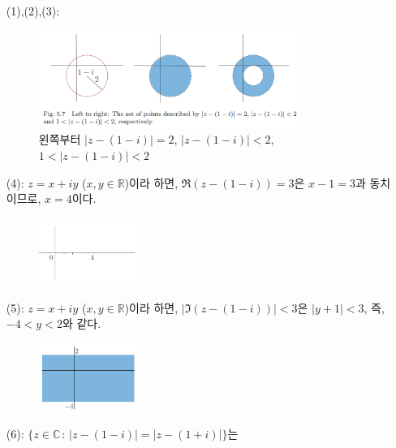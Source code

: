 \begin{itemize}
\item[(1),(2),(3):] \
\begin{figure}[h!]
\begin{center}
\includegraphics[width=0.8\textwidth]{./figs/fig-5-7}
\end{center}
\caption{왼쪽부터 $|z-(1-i)|=2$, $|z-(1-i)|<2$,
$1<|z-(1-i)|<2$}
\label{fig-5-7}
\end{figure}
\item[(4):] $z=x+iy$ ($x,y\in\mathbb R$)이라 하면,
$\Re(z-(1-i))=3$은 $x-1=3$과 동치이므로, $x=4$이다.
\begin{figure}[h!]
\begin{center}
\includegraphics[width=0.3\textwidth]{./figs/fig-s-0-2}
\end{center}
\end{figure}
\item[(5):] $z=x+iy$ ($x,y\in\mathbb R$)이라 하면,
$|\Im(z-(1-i))|<3$은 $|y+1|<3$, 즉, $-4<y<2$와 같다.
\begin{figure}[h!]
\begin{center}
\includegraphics[width=0.3\textwidth]{./figs/fig-s-0-3}
\end{center}
\end{figure}
\item[(6):] $\{ z\in\mathbb C\,:\, |z-(1-i)| = |z-(1+i)|\}$는

\end{itemize}
